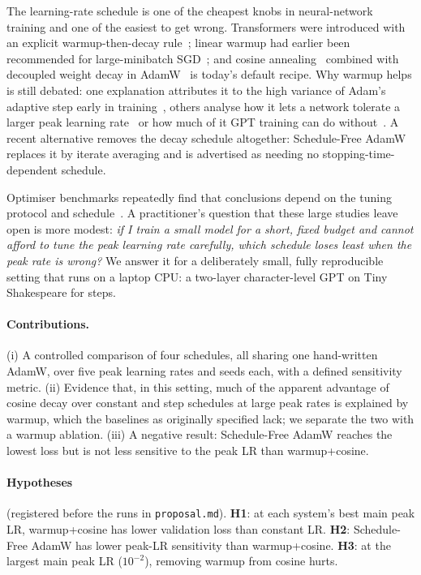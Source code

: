 The learning-rate schedule is one of the cheapest knobs in neural-network training and one of the easiest to get wrong. Transformers were introduced with an explicit warmup-then-decay rule~\cite{vaswani2017attention}; linear warmup had earlier been recommended for large-minibatch SGD~\cite{goyal2017accurate}; and cosine annealing~\cite{loshchilov2016sgdr} combined with decoupled weight decay in AdamW~\cite{loshchilov2017decoupled,kingma2014adam} is today's default recipe. Why warmup helps is still debated: one explanation attributes it to the high variance of Adam's adaptive step early in training~\cite{liu2019variance}, others analyse how it lets a network tolerate a larger peak learning rate~\cite{kalra2024why} or how much of it GPT training can do without~\cite{kosson2024analyzing}. A recent alternative removes the decay schedule altogether: Schedule-Free AdamW~\cite{defazio2024road} replaces it by iterate averaging and is advertised as needing no stopping-time-dependent schedule.

Optimiser benchmarks repeatedly find that conclusions depend on the tuning protocol and schedule~\cite{schmidt2020descending,dahl2023benchmarking}. A practitioner's question that these large studies leave open is more modest: \emph{if I train a small model for a short, fixed budget and cannot afford to tune the peak learning rate carefully, which schedule loses least when the peak rate is wrong?} We answer it for a deliberately small, fully reproducible setting that runs on a laptop CPU: a two-layer character-level GPT on Tiny Shakespeare for  steps.

\paragraph*{Contributions.} (i) A controlled comparison of four schedules, all sharing one hand-written AdamW, over five peak learning rates and  seeds each, with a defined sensitivity metric. (ii) Evidence that, in this setting, much of the apparent advantage of cosine decay over constant and step schedules at large peak rates is explained by warmup, which the baselines as originally specified lack; we separate the two with a warmup ablation. (iii) A negative result: Schedule-Free AdamW reaches the lowest loss but is not less sensitive to the peak LR than warmup+cosine.

\paragraph*{Hypotheses} (registered before the runs in \texttt{proposal.md}). \textbf{H1}: at each system's best main peak LR, warmup+cosine has lower validation loss than constant LR. \textbf{H2}: Schedule-Free AdamW has lower peak-LR sensitivity than warmup+cosine. \textbf{H3}: at the largest main peak LR ($10^{-2}$), removing warmup from cosine hurts.
